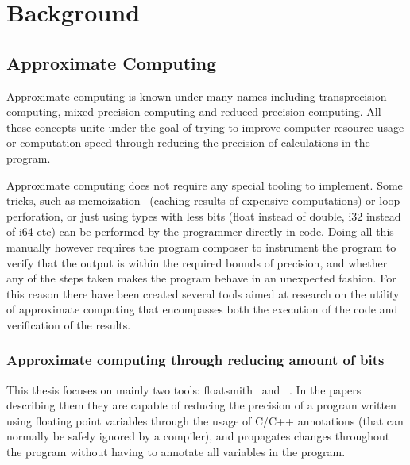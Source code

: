 \section{Background} 

\subsection{Approximate Computing}
Approximate computing is known under many names including transprecision computing, mixed-precision computing and reduced precision computing.
All these concepts unite under the goal of trying to improve computer resource usage or computation speed through reducing the precision of calculations in the program. 

Approximate computing does not require any special tooling to implement. Some tricks, such as memoization~\citep{} (caching results of expensive computations) or loop perforation\citep{li2018sculptor}, or just using types with less bits (float instead of double, i32 instead of i64 etc)\citep{} can be performed by the programmer directly in code. Doing all this manually however requires the program composer to instrument the program to verify that the output is within the required bounds of precision, and whether any of the steps taken makes the program behave in an unexpected fashion. For this reason there have been created several tools aimed at research on the utility of approximate computing that encompasses both the execution of the code and verification of the results. 

\subsubsection{Approximate computing through reducing amount of bits}
\label{section:approximate_computing_through_reducing_bits}

This thesis focuses on mainly two tools: floatsmith~\citep{floatsmith_paper} and \taffo{}~\citep{cherubin2019taffo}. In the papers describing them they are capable of reducing the precision of a program written using floating point variables through the usage of C/C++ annotations (that can normally be safely ignored by a compiler), and propagates changes throughout the program without having to annotate all variables in the program.

